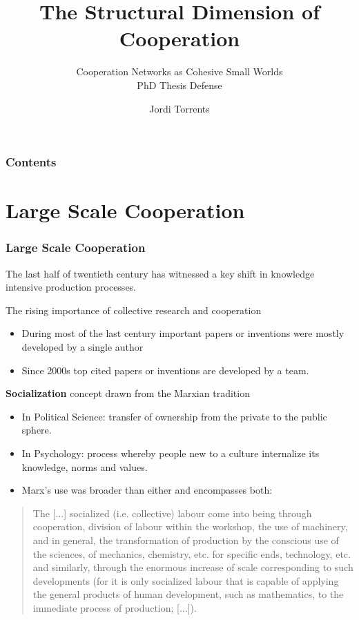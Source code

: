 \documentclass[ignorenonframetext,red,8pt,notes=hide]{beamer}
\title{The Structural Dimension of Cooperation}
\subtitle{Cooperation Networks as Cohesive Small Worlds\\PhD Thesis Defense}
\author{Jordi Torrents}
\institute{Department of Sociology\\University of Barcelona}
\begin{document}
\begin{frame}[label=portada]
\maketitle
\end{frame}

\begin{frame}[label=toc]
\frametitle{Contents}
\tableofcontents
\end{frame}

\section{Large Scale Cooperation}

\begin{frame}
\frametitle{Large Scale Cooperation}

The last half of twentieth century has witnessed a key shift in knowledge intensive production processes.

\begin{block}{The rising importance of collective research and cooperation \citep{uzzi:2007a}}
\begin{itemize}
\item During most of the last century important papers or inventions were mostly developed by a single author 
\item Since 2000s top cited papers or inventions are developed by a team.
\end{itemize}
\end{block}

\pause

\begin{block}{\textbf{Socialization} concept drawn from the Marxian tradition \citep{adler:2007}}
\begin{itemize}
\item In Political Science: transfer of ownership from the private to the public sphere.
\item In Psychology: process whereby people new to a culture internalize its knowledge, norms and values.
\item Marx's use was broader than either and encompasses both:
\end{itemize}
\begin{quote}
The [...] socialized (i.e. collective) labour come into being through cooperation, division of labour within the workshop, the use of machinery, and in general, the transformation of production by the conscious use of the sciences, of mechanics, chemistry, etc. for specific ends, technology, etc. and similarly, through the enormous increase of scale corresponding to such developments (for it is only socialized labour that is capable of applying the general products of human development, such as mathematics, to the immediate process of production; [...]). \citep[1024]{marx:1990}
\end{quote}
\end{block}

\end{frame}
\end{document}
